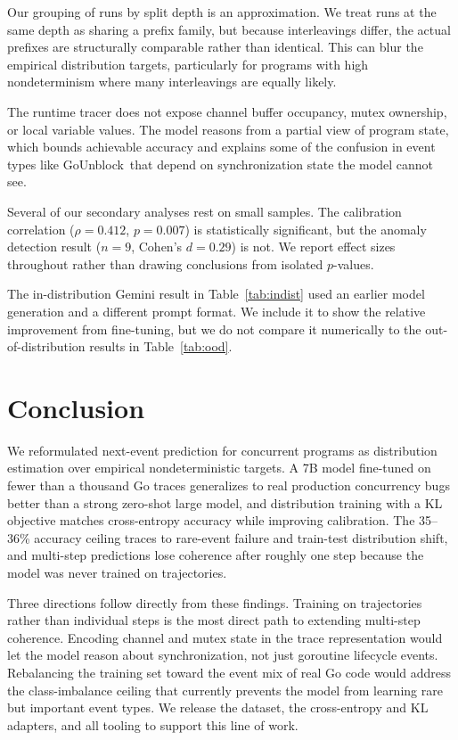 \documentclass{svproc}
\newcommand{\punblock}{\textsf{GoUnblock}}
\begin{document}
Our grouping of runs by split depth is an approximation. We treat runs
at the same depth as sharing a prefix family, but because interleavings
differ, the actual prefixes are structurally comparable rather than
identical. This can blur the empirical distribution targets, particularly
for programs with high nondeterminism where many interleavings are
equally likely.

The runtime tracer does not expose channel buffer occupancy, mutex
ownership, or local variable values. The model reasons from a partial
view of program state, which bounds achievable accuracy and explains
some of the confusion in event types like \punblock\ that depend on
synchronization state the model cannot see.

Several of our secondary analyses rest on small samples. The calibration
correlation ($\rho=0.412$, $p=0.007$) is statistically significant, but
the anomaly detection result ($n{=}9$, Cohen's $d=0.29$) is not. We
report effect sizes throughout rather than drawing conclusions from
isolated $p$-values.

The in-distribution Gemini result in Table~\ref{tab:indist} used
an earlier model generation and a different prompt format. We include
it to show the relative improvement from fine-tuning, but we do not
compare it numerically to the out-of-distribution results in
Table~\ref{tab:ood}.

\section{Conclusion}\label{sec:conclusion}

We reformulated next-event prediction for concurrent programs as
distribution estimation over empirical nondeterministic targets. A 7B
model fine-tuned on fewer than a thousand Go traces generalizes to real
production concurrency bugs better than a strong zero-shot large model,
and distribution training with a KL objective matches cross-entropy
accuracy while improving calibration. The 35--36\% accuracy ceiling
traces to rare-event failure and train-test distribution shift, and
multi-step predictions lose coherence after roughly one step because the
model was never trained on trajectories.

Three directions follow directly from these findings. Training on
trajectories rather than individual steps is the most direct path to
extending multi-step coherence. Encoding channel and mutex state in the
trace representation would let the model reason about synchronization,
not just goroutine lifecycle events. Rebalancing the training set toward
the event mix of real Go code would address the class-imbalance ceiling
that currently prevents the model from learning rare but important event
types. We release the dataset, the cross-entropy and KL adapters, and
all tooling to support this line of work.
\end{document}
